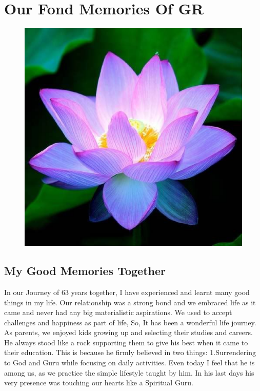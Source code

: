 \chapter[Our Fond Memories Of GR]{Our Fond Memories Of GR}\label{chap36}



\begin{figure}[H]
\centering
\includegraphics[scale=.3]{figures/chap23-fig1.eps}
\end{figure}

\section*{My Good Memories Together}

In our Journey of 63 years together, I have experienced and learnt many good things in my life. Our relationship was a strong bond and we embraced life as it came and never had any big materialistic aspirations. We used to accept challenges and happiness as part of life, So, It has been a wonderful life journey. As parents, we enjoyed kids growing up and selecting their studies and careers. He always stood like a rock supporting them to give his best when it came to their education. This is because he firmly believed in two things: 1.Surrendering to God and Guru while focusing on daily activities. Even today I feel that he is among us, as we practice the simple lifestyle taught by him. In his last days his very presence was touching our hearts like a Spiritual Guru. 

